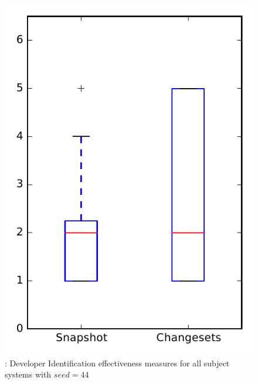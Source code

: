 
\begin{figure}
\centering
\includegraphics[height=0.4\textheight]{figures/dit_seed/rq1_overview_44}
\caption{\rtwo: Developer Identification effectiveness measures for all subject systems with $seed=44$}
\label{fig:dit_seed:rq1:overview}
\end{figure}
